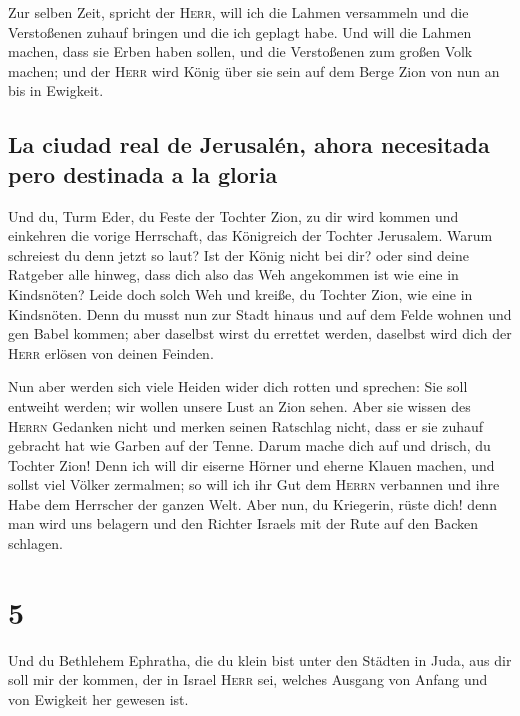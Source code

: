 Zur selben Zeit, spricht der \textsc{Herr}, will ich die
Lahmen versammeln und die Verstoßenen zuhauf bringen und die ich geplagt
habe.  Und will die Lahmen machen, dass sie Erben haben
sollen, und die Verstoßenen zum großen Volk machen; und der
\textsc{Herr} wird König über sie sein auf dem Berge Zion von nun an bis
in Ewigkeit.

\hypertarget{la-ciudad-real-de-jerusaluxe9n-ahora-necesitada-pero-destinada-a-la-gloria}{%
\subsection{La ciudad real de Jerusalén, ahora necesitada pero destinada
a la
gloria}\label{la-ciudad-real-de-jerusaluxe9n-ahora-necesitada-pero-destinada-a-la-gloria}}

 Und du, Turm Eder, du Feste der Tochter Zion, zu dir wird
kommen und einkehren die vorige Herrschaft, das Königreich der Tochter
Jerusalem.  Warum schreiest du denn jetzt so laut? Ist der
König nicht bei dir? oder sind deine Ratgeber alle hinweg, dass dich
also das Weh angekommen ist wie eine in Kindsnöten? 
Leide doch solch Weh und kreiße, du Tochter Zion, wie eine in
Kindsnöten. Denn du musst nun zur Stadt hinaus und auf dem Felde wohnen
und gen Babel kommen; aber daselbst wirst du errettet werden, daselbst
wird dich der \textsc{Herr} erlösen von deinen Feinden.

 Nun aber werden sich viele Heiden wider dich rotten und
sprechen: Sie soll entweiht werden; wir wollen unsere Lust an Zion
sehen.  Aber sie wissen des \textsc{Herrn} Gedanken nicht
und merken seinen Ratschlag nicht, dass er sie zuhauf gebracht hat wie
Garben auf der Tenne.  Darum mache dich auf und drisch,
du Tochter Zion! Denn ich will dir eiserne Hörner und eherne Klauen
machen, und sollst viel Völker zermalmen; so will ich ihr Gut dem
\textsc{Herrn} verbannen und ihre Habe dem Herrscher der ganzen Welt.
 Aber nun, du Kriegerin, rüste dich! denn man wird uns
belagern und den Richter Israels mit der Rute auf den Backen schlagen.

\hypertarget{section-4}{%
\section{5}\label{section-4}}

 Und du Bethlehem Ephratha, die du klein bist unter den
Städten in Juda, aus dir soll mir der kommen, der in Israel
\textsc{Herr} sei, welches Ausgang von Anfang und von Ewigkeit her
gewesen ist.

